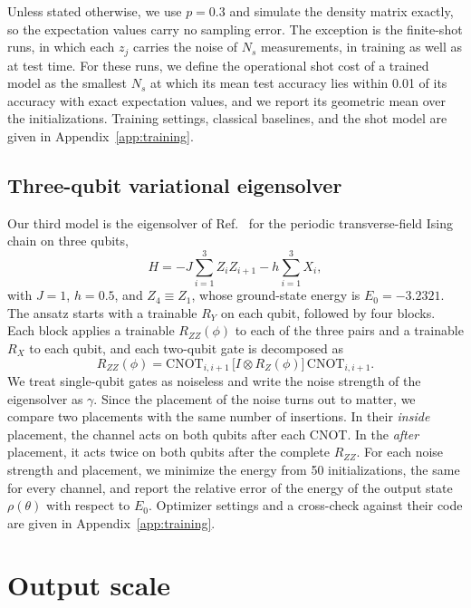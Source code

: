 \documentclass[
 aps,pra,
 twocolumn,
 superscriptaddress,
 longbibliography,
 nofootinbib
]{revtex4-2}
\begin{document}
Unless stated otherwise, we use $p=0.3$ and simulate the density matrix
exactly, so the expectation values carry no sampling error. The exception is
the finite-shot runs, in which each $z_j$ carries the noise of $N_s$
measurements, in training as well as at test time. For these runs, we define
the operational shot cost of a trained model as the smallest $N_s$ at which its
mean test accuracy lies within 0.01 of its accuracy with exact expectation
values, and we report its geometric mean over the initializations. Training
settings, classical baselines, and the shot model are given in
Appendix~\ref{app:training}.

\subsection{Three-qubit variational eigensolver}
\label{sec:model_vqe}

Our third model is the eigensolver of Ref.~\cite{vanrossum2026biased} for the
periodic transverse-field Ising chain on three qubits,
\begin{equation}
H=-J\sum_{i=1}^{3}Z_iZ_{i+1}-h\sum_{i=1}^{3}X_i ,
\label{eq:tfim}
\end{equation}
with $J=1$, $h=0.5$, and $Z_4\equiv Z_1$, whose ground-state energy is
$E_0=-3.2321$. The ansatz starts with a trainable $R_Y$ on each qubit, followed
by four blocks. Each block applies a trainable $R_{ZZ}(\phi)$ to each of the three pairs and a
trainable $R_X$ to each qubit, and each two-qubit gate is decomposed as
\begin{equation}
R_{ZZ}(\phi)=\mathrm{CNOT}_{i,i+1}\,\bigl[I\otimes R_Z(\phi)\bigr]\,
\mathrm{CNOT}_{i,i+1} .
\label{eq:rzz}
\end{equation}
We treat single-qubit gates as noiseless and write the noise strength of the
eigensolver as $\gamma$.
Since the placement of the noise turns out to matter, we compare two placements
with the same number of insertions. In their \textit{inside}
placement, the channel acts on both qubits
after each CNOT. In the \textit{after} placement, it acts twice on both qubits
after the complete $R_{ZZ}$. For each noise strength and placement, we minimize
the energy from 50 initializations, the same for every channel, and report the
relative error of the energy of the output state $\rho(\theta)$ with respect
to $E_0$. Optimizer settings and a cross-check against their code are given in Appendix~\ref{app:training}.

\section{Output scale}
\label{sec:scale}
\end{document}

